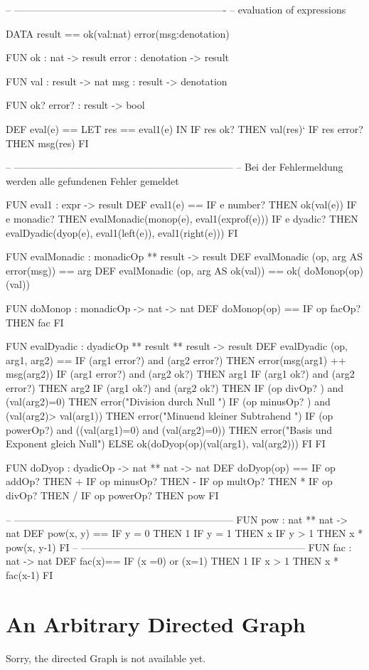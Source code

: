 \begin{prog}
-- ----------------------------------------------------------------
-- evaluation of expressions

DATA result == ok(val:nat)
                error(msg:denotation)

FUN ok : nat -> result
    error : denotation -> result

FUN val : result -> nat
    msg : result -> denotation

FUN ok? error? : result -> bool



DEF eval(e) ==
        LET res == eval1(e)
        IN 
        IF res ok? THEN val(res)`
        IF res error? THEN  msg(res)
        FI

-- ------------------------------------------------------------------
-- Bei der Fehlermeldung werden alle gefundenen Fehler gemeldet

FUN eval1 : expr -> result
DEF eval1(e) ==
        IF e number? THEN ok(val(e))
        IF e monadic? THEN evalMonadic(monop(e), eval1(exprof(e)))
        IF e dyadic? THEN evalDyadic(dyop(e), 
                                     eval1(left(e)), 
                                     eval1(right(e)))
        FI

FUN evalMonadic : monadicOp ** result -> result
DEF evalMonadic (op, arg AS error(msg)) == arg
DEF evalMonadic (op, arg AS ok(val))    == ok( doMonop(op)(val))

FUN doMonop : monadicOp -> nat -> nat
DEF doMonop(op) == 
        IF op facOp? THEN fac
        FI


FUN evalDyadic : dyadicOp ** result ** result -> result
DEF evalDyadic (op, arg1, arg2) ==
        IF (arg1 error?) and (arg2 error?) 
                   THEN error(msg(arg1) ++ msg(arg2))
        IF (arg1 error?) and (arg2 ok?) THEN arg1
        IF (arg1 ok?) and (arg2 error?) THEN arg2
        IF (arg1 ok?) and (arg2 ok?) THEN 
          IF (op divOp? ) and (val(arg2)=0) 
                   THEN error("Division durch Null ")
          IF (op minusOp? ) and (val(arg2)> val(arg1))
                          THEN error("Minuend kleiner Subtrahend ")
          IF (op powerOp?) and ((val(arg1)=0) and (val(arg2)=0)) 
                          THEN error("Basis und Exponent gleich Null")
           ELSE ok(doDyop(op)(val(arg1), val(arg2)))
          FI
        FI

FUN doDyop : dyadicOp -> nat ** nat -> nat
DEF doDyop(op) == 
        IF op addOp? THEN +
        IF op minusOp? THEN -
        IF op multOp? THEN *
        IF op divOp? THEN /
        IF op powerOp? THEN pow
        FI 

-- ------------------------------------------------------------------
FUN pow : nat ** nat -> nat
DEF pow(x, y) == IF y = 0 THEN 1
                 IF y = 1 THEN x
                 IF y > 1 THEN x * pow(x, y-1)
                 FI
-- --------------------------------------------------------------------
FUN fac : nat -> nat
DEF fac(x)==    IF (x =0) or (x=1) THEN 1
                IF x > 1 THEN x * fac(x-1) 
                FI
\end{prog}


\section{An Arbitrary Directed Graph}
\label{app:graph}

Sorry, the directed Graph is not available yet.

